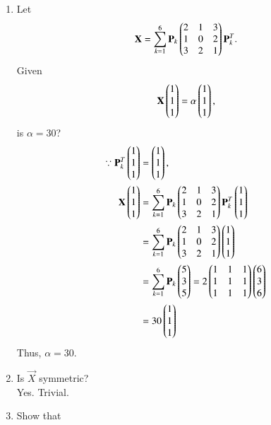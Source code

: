 \documentclass[journal,12pt,twocolumn]{IEEEtran}
\renewcommand\thesection{\arabic{section}}
\begin{document}
\begin{enumerate}[label=\thesection.\arabic*
,ref=\thesection.\theenumi]
\item Let 
\begin{align}
\mathbf{X} = \sum_{k=1}^{6}\mathbf{P}_k\begin{pmatrix}2 & 1 & 3 \\ 1 & 0 & 2 \\ 3 & 2 & 1\end{pmatrix}\mathbf{P}_k^T.
\end{align}
Given 
\begin{align}
\mathbf{X}\begin{pmatrix}1 \\1 \\1\end{pmatrix} = \alpha\begin{pmatrix}1 \\1 \\1\end{pmatrix},
\label{eq:2019_qp2_1_alpha}
\end{align}
is
$\alpha= 30$?
\\
\solution 
\begin{align}
\because \mathbf{P}_k^T\begin{pmatrix}1 \\1 \\1\end{pmatrix} &=  \begin{pmatrix}1 \\1 \\1\end{pmatrix},
\nonumber \\
\mathbf{X}\begin{pmatrix}1 \\1 \\1\end{pmatrix} &= \sum_{k=1}^{6}\mathbf{P}_k\begin{pmatrix}2 & 1 & 3 \\ 1 & 0 & 2 \\ 3 & 2 & 1\end{pmatrix}\mathbf{P}_k^T\begin{pmatrix}1 \\1 \\1\end{pmatrix} 
\nonumber \\
&= \sum_{k=1}^{6}\mathbf{P}_k\begin{pmatrix}2 & 1 & 3 \\ 1 & 0 & 2 \\ 3 & 2 & 1\end{pmatrix}\begin{pmatrix}1 \\1 \\1\end{pmatrix} 
\nonumber \\
&= \sum_{k=1}^{6}\mathbf{P}_k\begin{pmatrix}5 \\3 \\5\end{pmatrix} =2\begin{pmatrix}1 & 1 & 1 \\ 1 & 1 & 1 \\ 1 & 1 & 1\end{pmatrix}\begin{pmatrix}6 \\3 \\6\end{pmatrix}
\nonumber \\
&= 30\begin{pmatrix}1 \\1 \\1\end{pmatrix} 
\end{align}
%
Thus, $\alpha=30$.
\item Is $\vec{X}$  symmetric?
\\
\solution Yes. Trivial.
\item Show that 
\begin{align}

\end{align}
\end{enumerate}
\end{document}
